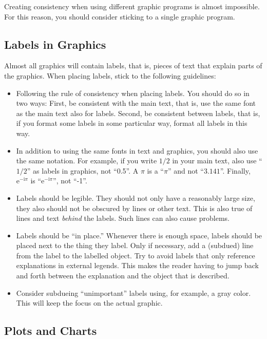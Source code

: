 Creating consistency when using different graphic programs is almost
impossible. For this reason, you should consider sticking to a single
graphic program.


\subsection{Labels in Graphics}

Almost all graphics will contain labels, that is, pieces of text that
explain parts of the graphics. When placing labels, stick to the
following guidelines:

\begin{itemize}
\item
  Following the rule of consistency when placing labels. You should do
  so in two ways: First, be consistent with the main text, that is,
  use the same font as the main text also for labels. Second, be
  consistent between labels, that is, if you format some labels in
  some particular way, format all labels in this way.
\item
  In addition to using the same fonts in text and graphics, you should
  also use the same notation. For example, if you write $1/2$ in your
  main text, also use ``$1/2$'' as labels in graphics, not
  ``0.5''. A $\pi$ is a ``$\pi$'' and not ``$3.141$''. Finally,
  $\mathrm e^{-\mathrm i \pi}$ is ``$\mathrm e^{-\mathrm i \pi}$'',
  not ``-1''. 
\item
  Labels should be legible. They should not only have a reasonably
  large size, they also should not be obscured by lines or other
  text. This is also true of lines and text \emph{behind} the
  labels. Such lines can also cause problems.
\item
  Labels should be ``in  place.'' Whenever there is enough space,
  labels should be placed next to the thing they label. Only if
  necessary, add a (subdued) line from the label to the labelled
  object. Try to avoid labels that only reference explanations in
  external legends. This makes the reader having to jump back and
  forth between the explanation and the object that is described.
\item
  Consider subdueing ``unimportant'' labels using, for example, a gray
  color. This will keep the focus on the actual graphic.
\end{itemize}



\subsection{Plots and Charts}

